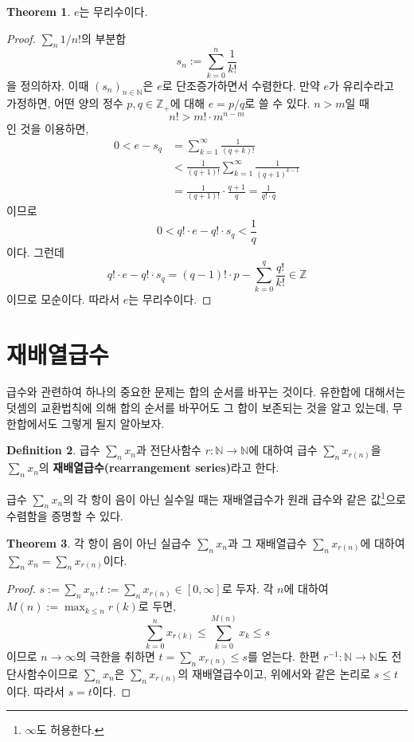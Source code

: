 \documentclass[11pt]{book}
\numberwithin{equation}{chapter}
\def\NN{\mathbb{N}}
\def\ZZ{\mathbb{Z}}
\theoremstyle{definition}
\newtheorem{thm}{Theorem}[section]
\newtheorem{defn}[thm]{Definition}
\begin{document}
\begin{thm}
    \(e\)는 무리수이다.
\end{thm}
\begin{proof}
    \(\sum_n 1/n!\)의 부분합
    \[
    s_n := \sum_{k=0}^n \frac{1}{k!} 
    \]
    을 정의하자. 이때 \((s_n)_{n \in \NN}\)은 \(e\)로 단조증가하면서 수렴한다. 만약 \(e\)가 유리수라고 가정하면, 어떤 양의 정수 \(p, q \in \ZZ_+\)에 대해 \(e = p/q\)로 쓸 수 있다. \(n > m\)일 때
    \[
        n! > m! \cdot m^{n-m}
    \]
    인 것을 이용하면,
    \begin{align*}
        0 < e - s_q &= \sum_{k=1}^\infty \frac{1}{(q+k)!}\\
        &< \frac{1}{(q+1)!} \sum_{k=1}^\infty \frac{1}{(q+1)^{k-1}}\\
        &= \frac{1}{(q+1)!} \cdot \frac{q+1}{q} = \frac{1}{q! \cdot q}
    \end{align*}
    이므로
    \[
    0 < q! \cdot e - q! \cdot s_q < \frac{1}{q}    
    \]
    이다. 그런데
    \[
        q! \cdot e - q! \cdot s_q = (q-1)! \cdot p - \sum_{k=0}^q \frac{q!}{k!} \in \ZZ   
    \]
    이므로 모순이다. 따라서 \(e\)는 무리수이다.
\end{proof}

\section{재배열급수}

급수와 관련하여 하나의 중요한 문제는 합의 순서를 바꾸는 것이다. 유한합에 대해서는 덧셈의 교환법칙에 의해 합의 순서를 바꾸어도 그 합이 보존되는 것을 알고 있는데, 무한합에서도 그렇게 될지 알아보자.

\begin{defn}
    급수 \(\sum_n x_n\)과 전단사함수 \(r : \NN \to \NN\)에 대하여 급수 \(\sum_n x_{r(n)}\)을 \(\sum_n x_n\)의 \textbf{재배열급수(rearrangement series)}라고 한다.
\end{defn}

급수 \(\sum_n x_n\)의 각 항이 음이 아닌 실수일 때는 재배열급수가 원래 급수와 같은 값\footnote{\(\infty\)도 허용한다.}으로 수렴함을 증명할 수 있다.

\begin{thm}
    각 항이 음이 아닌 실급수 \(\sum_n x_n\)과 그 재배열급수 \(\sum_n x_{r(n)}\)에 대하여 \(\sum_n x_n = \sum_n x_{r(n)}\)이다.
\end{thm}
\begin{proof}
    \(s := \sum_n x_n, t := \sum_n x_{r(n)} \in [0, \infty]\)로 두자. 각 \(n\)에 대하여 \(M(n) := \max_{k \le n} r(k)\)로 두면,
    \[
    \sum_{k=0}^n x_{r(k)} \le \sum_{k=0}^{M(n)} x_{k} \le s
    \]
    이므로 \(n \to \infty\)의 극한을 취하면 \(t = \sum_n x_{r(n)} \le s\)를 얻는다. 한편 \(r^{-1} : \NN \to \NN\)도 전단사함수이므로 \(\sum_n x_n\)은 \(\sum_n x_{r(n)}\)의 재배열급수이고, 위에서와 같은 논리로 \(s \le t\)이다. 따라서 \(s = t\)이다.
\end{proof}
\end{document}
